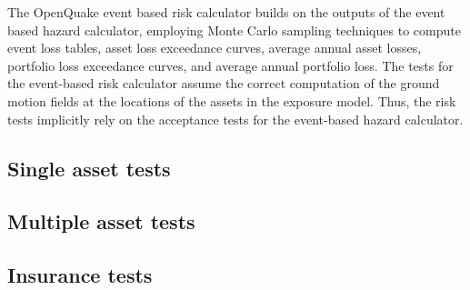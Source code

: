The OpenQuake event based risk calculator builds on the outputs of the event based hazard calculator, employing Monte Carlo sampling techniques to compute event loss tables, asset loss exceedance curves, average annual asset losses, portfolio loss exceedance curves, and average annual portfolio loss. The tests for the event-based risk calculator assume the correct computation of the ground motion fields at the locations of the assets in the exposure model. Thus, the risk tests implicitly rely on the acceptance tests for the event-based hazard calculator.

\subsection{Single asset tests}
\label{subsec:acc-ebr-single}


\subsection{Multiple asset tests}
\label{subsec:acc-ebr-multiple}


\subsection{Insurance tests}
\label{subsec:acc-ebr-insurance}


% 